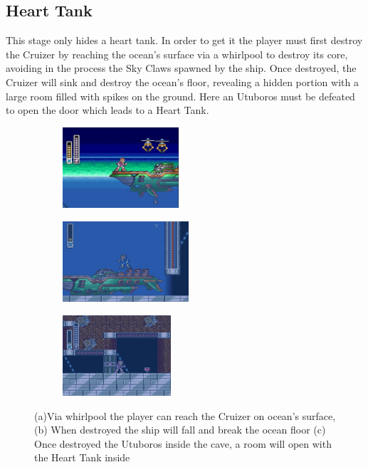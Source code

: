 \subsection{Heart Tank}
This stage only hides a heart tank. In order to get it the player must first destroy the Cruizer by reaching the ocean's surface via a whirlpool to destroy its core, avoiding in the process the Sky Claws spawned by the ship. Once destroyed, the Cruizer will sink and  destroy the ocean's floor, revealing a hidden portion with a large room filled with spikes on the ground. Here an Utuboros  must be defeated to open the door which leads to a Heart Tank. 
\begin{figure}[htp]
	\centering
	\begin{subfigure}{0.4\textwidth}
		\centering
		\includegraphics[height=3cm]{figures/X1/Launch_octopus/Octopus_heart_1.jpg}
		\caption{}
	\end{subfigure}
	\begin{subfigure}{0.4\textwidth}
		\centering
		\includegraphics[height=3cm]{figures/X1/Launch_octopus/Octopus_heart_2.jpg}
		\caption{}
	\end{subfigure}
	\begin{subfigure}{0.4\textwidth}
		\centering
		\includegraphics[height=3cm]{figures/X1/Launch_octopus/Octopus_heart_3.jpg}
		\caption{}
	\end{subfigure}
	\caption{(a)Via whirlpool the player can reach the Cruizer on ocean's surface,(b) When destroyed the ship will fall and break the ocean floor (c) Once destroyed the Utuboros inside the cave, a room will open with the Heart Tank inside}
\end{figure}

